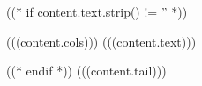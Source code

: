 ((* if content.text.strip() != '' *))
\begin{longtable}{(((content.cols)))}
\hline
(((content.text)))
\end{longtable}
((* endif *)) (((content.tail)))
